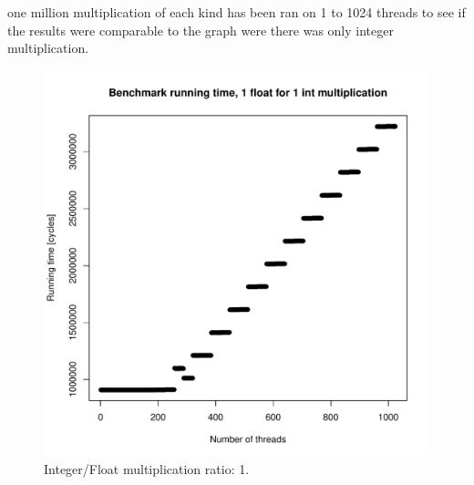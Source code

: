 \documentclass{report}
\def \scalingfactor{.8}
\begin{document}
	one million multiplication of each kind has been ran on 1 to 1024 threads to
    see if the results were comparable to the graph were there was only integer multiplication.
	\begin{figure}[h]
		\centering
		\vspace{-20pt}
    			\includegraphics[width=\scalingfactor\linewidth]{"graphics/running_times_ratio11"}
		\vspace{-15pt}
		\captionsetup{justification=centering}
		\caption{Integer/Float multiplication ratio: 1.}
	\end{figure}
	\pagebreak
\end{document}
